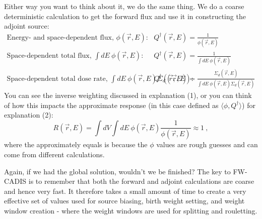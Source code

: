 \documentclass[12pt]{article}
\begin{document}
\vspace*{1 em}
Either way you want to think about it, we do the same thing. 
We do a coarse deterministic calculation to get the forward flux and use it in constructing the adjoint source:
\begin{align*}
\text{Energy- and space-dependent flux, } \phi(\vec{r},E): \quad & Q^{\dagger}(\vec{r},E) = \frac{1}{\phi(\vec{r},E)}\\
\text{Space-dependent total flux, } \int dE\:\phi(\vec{r},E): \quad & Q^{\dagger}(\vec{r},E) = \frac{1}{\int dE\:\phi(\vec{r},E)}\\
\text{Space-dependent total dose rate, } \int dE\:\phi(\vec{r},E) \Sigma_d(\vec{r},E): \quad & Q^{\dagger}(\vec{r},E) = \frac{\Sigma_d(\vec{r},E)}{\int dE\:\phi(\vec{r},E)\Sigma_d(\vec{r},E)}
\end{align*} 
You can see the inverse weighting discussed in explanation (1), or you can think of how this impacts the approximate response (in this case defined as $\langle \phi, Q^{\dagger}\rangle$) for explanation (2):
\[
R(\vec{r},E) = \int dV \int dE \: \phi(\vec{r},E) \frac{1}{\phi(\vec{r},E)} \approx 1\:,
\]
where the approximately equals is because the $\phi$ values are rough guesses and can come from different calculations.

Again, if we had the global solution, wouldn't we be finished? The key to
FW-CADIS is to remember that both the forward and adjoint calculations are
coarse and hence very fast. It therefore takes a small amount of time to
create a very effective set of values used for source biasing, birth weight
setting, and weight window creation - where the weight windows are used for
splitting and rouletting. 

\end{document}
